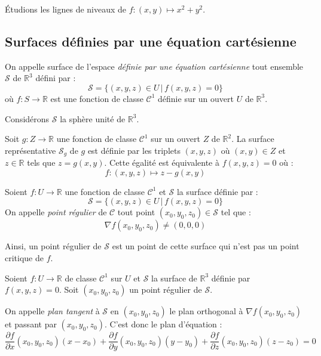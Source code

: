 \documentclass[a4paper,10pt]{report}
\begin{document}
\begin{ex} Étudions les lignes de niveaux de $f : (x,y) \mapsto x^2+y^2$.

\vspace{6cm}
\end{ex}



\subsection{Surfaces définies par une équation cartésienne}
\medskip

\noindent On appelle surface de l'espace \textit{définie par une équation cartésienne} tout ensemble $\mathcal{S}$ de $\mathbb{R}^3$ défini par :
$$ \mathcal{S} = \lbrace (x,y,z) \in U \, \vert \, f(x,y,z)=0 \rbrace$$
où $f : S \rightarrow \mathbb{R}$ est une fonction de classe $\mathcal{C}^1$ définie sur un ouvert $U$ de $\mathbb{R}^3$.

\medskip

\begin{exems}
\item Considérons $\mathcal{S}$ la sphère unité de $\mathbb{R}^3$.

\vspace{5cm}
\item Soit $g : Z \rightarrow \mathbb{R}$ une fonction de classe $\mathcal{C}^1$ sur un ouvert $Z$ de $\mathbb{R}^2$. La surface représentative $\mathcal{S}_g$ de $g$ est définie par les triplets $(x,y,z)$ où $(x,y) \in Z$ et $z \in \mathbb{R}$ tels que $z=g(x,y)$. Cette égalité est équivalente à $f(x,y,z) =0$ où :
$$ f : (x,y,z) \mapsto z-g(x,y) $$
\end{exems}

\begin{defin} Soient $f : U \rightarrow \mathbb{R}$ une fonction de classe $\mathcal{C}^1$ et $\mathcal{S}$ la surface définie par :
$$ \mathcal{S} = \lbrace (x,y,z) \in U \, \vert \, f(x,y,z)=0 \rbrace$$
\noindent On appelle \textit{point régulier} de $\mathcal{C}$ tout point $(x_0,y_0,z_0) \in \mathcal{S}$ tel que :
$$ \nabla f(x_0,y_0,z_0) \neq (0,0,0)$$
\end{defin}
\noindent Ainsi, un point régulier de $\mathcal{S}$ est un point de cette surface qui n'est pas un point critique de $f$.

\begin{defin} Soient $f : U \rightarrow \mathbb{R}$ de classe $\mathcal{C}^1$ sur $U$ et $\mathcal{S}$ la surface de $\mathbb{R}^3$ définie par $f(x,y,z)=0$. Soit $(x_0,y_0,z_0)$ un point régulier de $\mathcal{S}$.

\noindent On appelle \textit{plan tangent} à $\mathcal{S}$ en $(x_0,y_0,z_0)$ le plan orthogonal à $\nabla f(x_0,y_0,z_0)$ et passant par $(x_0,y_0,z_0)$. C'est donc le plan d'équation :
$$ \dfrac{\partial f}{\partial x}(x_0,y_0,z_0) (x-x_0) +  \dfrac{\partial f}{\partial y}(x_0,y_0,z_0) (y-y_0) +  \dfrac{\partial f}{\partial z}(x_0,y_0,z_0) (z-z_0) = 0$$
\end{defin}
\end{document}
